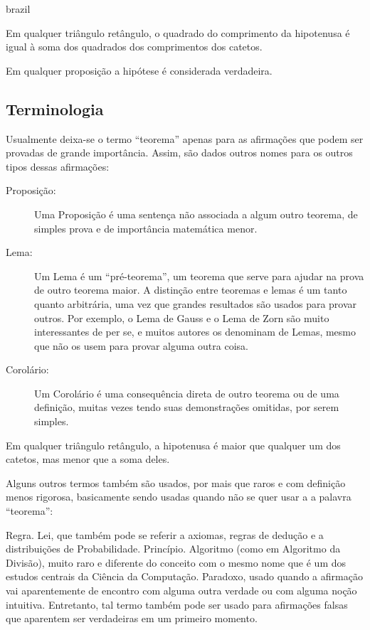 \begin{otherlanguage*}{brazil}
\begin{teorema}
    Em qualquer triângulo retângulo, o quadrado do comprimento da hipotenusa é igual à soma dos quadrados dos comprimentos dos catetos.
\end{teorema}


\begin{proposicao}
Em qualquer proposição a hipótese é considerada verdadeira.
\end{proposicao}
\subsection{Terminologia}



Usualmente deixa-se o termo ``teorema'' apenas para as afirmações que podem ser provadas de grande importância. Assim, são dados outros nomes para os outros tipos dessas afirmações:

\begin{description}
    \item[Proposição:] Uma Proposição é uma sentença não associada a algum outro teorema, de simples prova e de importância matemática menor.
    \item[Lema:] Um Lema é um ``pré-teorema'', um teorema que serve para ajudar na prova de outro teorema maior. A distinção entre teoremas e lemas é um tanto quanto arbitrária, uma vez que grandes resultados são usados para provar outros. Por exemplo, o Lema de Gauss e o Lema de Zorn são muito interessantes de per se, e muitos autores os denominam de Lemas, mesmo que não os usem para provar alguma outra coisa.
    \item[Corolário:] Um Corolário é uma consequência direta de outro teorema ou de uma definição, muitas vezes tendo suas demonstrações omitidas, por serem simples.
\end{description}


\begin{corolario}
    Em qualquer triângulo retângulo, a hipotenusa é maior que qualquer um dos catetos, mas menor que a soma deles.
\end{corolario}

Alguns outros termos também são usados, por mais que raros e com definição menos rigorosa, basicamente sendo usadas quando não se quer usar a a palavra ``teorema'':

Regra.
Lei, que também pode se referir a axiomas, regras de dedução e a distribuições de Probabilidade.
Princípio.
Algoritmo (como em Algoritmo da Divisão), muito raro e diferente do conceito com o mesmo nome que é um dos estudos centrais da Ciência da Computação.
Paradoxo, usado quando a afirmação vai aparentemente de encontro com alguma outra verdade ou com alguma noção intuitiva. Entretanto, tal termo também pode ser usado para afirmações falsas que aparentem ser verdadeiras em um primeiro momento.


\end{otherlanguage*}
